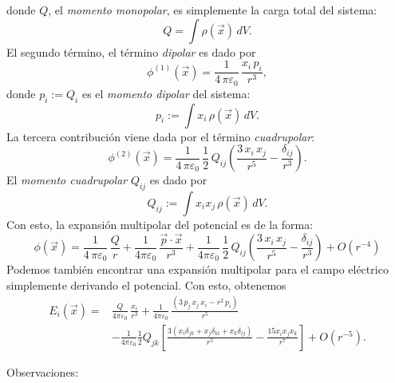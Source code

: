 donde $Q$, el \textit{momento monopolar}, es simplemente la carga total del sistema:
\begin{equation} \label{eq3.2.6}
Q=\int \rho(\vec{x})\,dV.
\end{equation}
El segundo término, el término {\em dipolar} es dado por
\begin{equation}
\phi^{(1)}(\vec{x}) =\frac{1}{4\,\pi\varepsilon_0}\,\frac{x_i\,p_i}{r^3},
\end{equation}
donde $p_i:=Q_i$ es el \textit{momento dipolar} del sistema:
\begin{equation} \label{eq3.2.8}
p_i:=\int x_i\,\rho(\vec{x})\,dV.
\end{equation}
La tercera contribución viene dada por el término {\em cuadrupolar}:
\begin{equation} \label{eq3.2.9}
\phi^{(2)}(\vec{x})=\frac{1}{4\,\pi\varepsilon_0}\,\frac{1}{2}\,Q_{ij}
\left(\frac{3\,x_i\,x_j}{r^5}-\frac{\delta_{ij}}{r^3}\right).
\end{equation}
El \textit{momento cuadrupolar} $Q_{ij}$ es dado por
\begin{equation}
Q_{ij}:=\int x_ix_j\,\rho(\vec{x})\,dV. \label{mom4}
\end{equation}
Con esto, la expansión multipolar del potencial es de la forma:
\begin{equation} \label{eq3.2.12}
\boxed{\phi(\vec{x})=\frac{1}{4\,\pi\varepsilon_0}\,\frac{Q}{r}+
\frac{1}{4\pi\varepsilon_0}\,\frac{\vec{p}\cdot\vec{x}}{r^3}+
\frac{1}{4\pi\varepsilon_0}\,\frac{1}{2}\,Q_{ij}\left(\frac{3\,x_i\,x_j}{
r^5}-\frac{\delta_{ij}}{r^3}\right)+O(r^{-4})}
\end{equation}
Podemos también encontrar una expansión multipolar para el campo eléctrico
simplemente derivando el potencial. Con esto, obtenemos
\begin{align} \label{eq3.2.12.1}
E_i(\vec{x}) =& \frac{Q}{4\pi\varepsilon_0}\,\frac{x_i}{r^3}+\frac{1}{
4\pi\varepsilon_0}\,\frac{(3\,p_j\,x_j\,x_i-r^2\,p_i)}{r^5} \nonumber\\
& - \frac{1}{4\pi\varepsilon_0}\frac{1}{2}Q_{jk}\left[
\frac{3\left(x_i\delta_{jk}+x_j\delta_{ki}+x_k\delta_{ij}\right)}{r^5}
-\frac{15x_ix_jx_k}{r^7}\right]
+O(r^{-5}) .
\end{align}

Observaciones:

